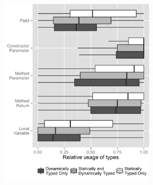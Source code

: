 \documentclass[msc]{ppgccufmg}
\renewcommand{\arraystretch}{1.2}
\begin{document}
\begin{figure}[ht!]
\centering 
\includegraphics[width=0.7\textwidth]{../aosd_2014/analysis/result/background/comparison/boxplots/6_declarations_by_type.png} 
\vspace{0.1cm}
\renewcommand{\arraystretch}{1.2}



\end{figure}
\end{document}
